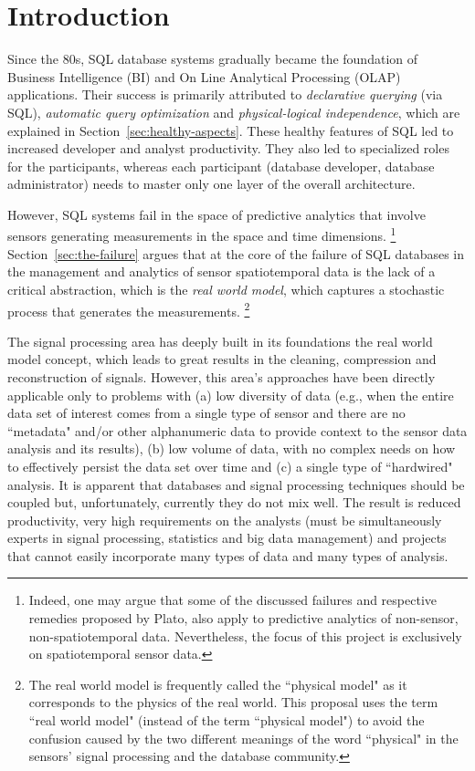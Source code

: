 
\section{Introduction}
\label{sec:introduction}
Since the 80s, SQL database systems gradually became the foundation of Business Intelligence (BI) and On Line Analytical Processing (OLAP) applications. Their success is primarily attributed to {\em declarative querying} (via SQL), {\em automatic query optimization} and {\em physical-logical independence}, which are explained in Section~\ref{sec:healthy-aspects}. These healthy features of SQL led to increased developer and analyst productivity. They also led to specialized roles for the participants, whereas each participant (database developer, database administrator) needs to master only one layer of the overall architecture. 

However, SQL systems fail in the space of predictive analytics that involve sensors generating measurements in the space and time dimensions.%
\footnote{Indeed, one may argue that some of the discussed failures and respective remedies proposed by Plato, also apply to predictive analytics of non-sensor, non-spatiotemporal data. Nevertheless, the focus of this project is exclusively on spatiotemporal sensor data.
}
Section~\ref{sec:the-failure} argues that at the core of the failure of SQL databases in the management and analytics of sensor spatiotemporal data is the lack of a critical abstraction, which is the {\em real world model}, which captures a stochastic process that generates the measurements.%
\footnote{The real world model is frequently called the ``physical model" as it corresponds to the physics of the real world. This proposal uses the term ``real world model" (instead of the term ``physical model") to avoid the confusion caused by the two different meanings of the word ``physical" in the sensors' signal processing and the database community.
}

The signal processing area has deeply built in its foundations the real world model concept, which leads to great results in the cleaning, compression and reconstruction of signals. However, this area's approaches have been directly applicable only to problems with (a) low diversity of data (e.g., when the entire data set of interest comes from a single type of sensor and there are no ``metadata" and/or other alphanumeric data to provide context to the sensor data analysis and its results), (b) low volume of data, with no complex needs on how to effectively persist the data set over time and (c) a single type of ``hardwired" analysis. 
It is apparent that databases and signal processing techniques should be coupled but, unfortunately, currently they do not mix well. The result is reduced productivity, very high requirements on the analysts (must be simultaneously experts in signal processing, statistics and big data management) and projects that cannot easily incorporate many types of data and many types of analysis.


